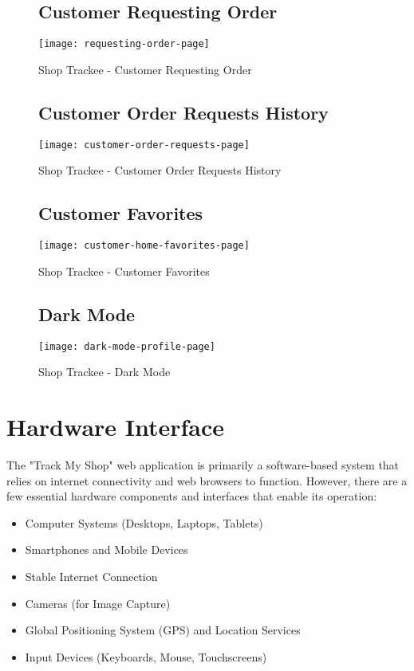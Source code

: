 \begin{figure}[h]
	\subsection{Customer Requesting Order}
	\centering
	\texttt{[image: requesting-order-page]}
	\caption{Shop Trackee - Customer Requesting Order}
\end{figure}
\newpage

\begin{figure}[h]
	\subsection{Customer Order Requests History}
	\centering
	\texttt{[image: customer-order-requests-page]}
	\caption{Shop Trackee - Customer Order Requests History}
\end{figure}

\begin{figure}[h]
	\subsection{Customer Favorites}
	\centering
	\texttt{[image: customer-home-favorites-page]}
	\caption{Shop Trackee - Customer Favorites}
\end{figure}
\newpage

\begin{figure}[h]
	\subsection{Dark Mode}
	\centering
	\texttt{[image: dark-mode-profile-page]}
	\caption{Shop Trackee - Dark Mode}
\end{figure}

\section{Hardware Interface}
The "Track My Shop" web application is primarily a software-based system that relies on internet connectivity and web browsers to function. However, there are a few essential hardware components and interfaces that enable its operation:

\begin{itemize}
	\item Computer Systems (Desktops, Laptops, Tablets)
	\item Smartphones and Mobile Devices
	\item Stable Internet Connection
	\item Cameras (for Image Capture)
	\item Global Positioning System (GPS) and Location Services
	\item Input Devices (Keyboards, Mouse, Touchscreens)
\end{itemize}

